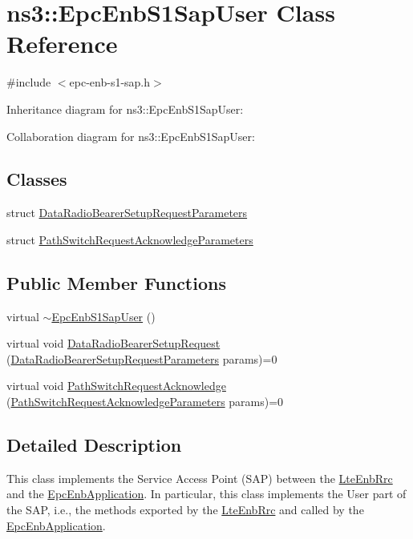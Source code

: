 \hypertarget{classns3_1_1EpcEnbS1SapUser}{}\section{ns3\+:\+:Epc\+Enb\+S1\+Sap\+User Class Reference}
\label{classns3_1_1EpcEnbS1SapUser}


{\ttfamily \#include $<$epc-\/enb-\/s1-\/sap.\+h$>$}



Inheritance diagram for ns3\+:\+:Epc\+Enb\+S1\+Sap\+User\+:


Collaboration diagram for ns3\+:\+:Epc\+Enb\+S1\+Sap\+User\+:
\subsection*{Classes}
\begin{DoxyCompactItemize}
\item 
struct \hyperlink{structns3_1_1EpcEnbS1SapUser_1_1DataRadioBearerSetupRequestParameters}{Data\+Radio\+Bearer\+Setup\+Request\+Parameters}
\item 
struct \hyperlink{structns3_1_1EpcEnbS1SapUser_1_1PathSwitchRequestAcknowledgeParameters}{Path\+Switch\+Request\+Acknowledge\+Parameters}
\end{DoxyCompactItemize}
\subsection*{Public Member Functions}
\begin{DoxyCompactItemize}
\item 
virtual \hyperlink{classns3_1_1EpcEnbS1SapUser_a714c3706e25c871348ca1ab15159c4ce}{$\sim$\+Epc\+Enb\+S1\+Sap\+User} ()
\item 
virtual void \hyperlink{classns3_1_1EpcEnbS1SapUser_a7eb9f4a23a2e071aee15f4dc2300cce4}{Data\+Radio\+Bearer\+Setup\+Request} (\hyperlink{structns3_1_1EpcEnbS1SapUser_1_1DataRadioBearerSetupRequestParameters}{Data\+Radio\+Bearer\+Setup\+Request\+Parameters} params)=0
\item 
virtual void \hyperlink{classns3_1_1EpcEnbS1SapUser_a6d6626240a259460b783a85ca51fc7e2}{Path\+Switch\+Request\+Acknowledge} (\hyperlink{structns3_1_1EpcEnbS1SapUser_1_1PathSwitchRequestAcknowledgeParameters}{Path\+Switch\+Request\+Acknowledge\+Parameters} params)=0
\end{DoxyCompactItemize}


\subsection{Detailed Description}
This class implements the Service Access Point (S\+AP) between the \hyperlink{classns3_1_1LteEnbRrc}{Lte\+Enb\+Rrc} and the \hyperlink{classns3_1_1EpcEnbApplication}{Epc\+Enb\+Application}. In particular, this class implements the User part of the S\+AP, i.\+e., the methods exported by the \hyperlink{classns3_1_1LteEnbRrc}{Lte\+Enb\+Rrc} and called by the \hyperlink{classns3_1_1EpcEnbApplication}{Epc\+Enb\+Application}. 

